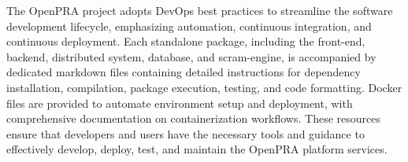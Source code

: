 The OpenPRA project adopts DevOps best practices to streamline the software development lifecycle, emphasizing automation, continuous integration, and continuous deployment. Each standalone package, including the front-end, backend, distributed system, database, and scram-engine, is accompanied by dedicated markdown files containing detailed instructions for dependency installation, compilation, package execution, testing, and code formatting. Docker files are provided to automate environment setup and deployment, with comprehensive documentation on containerization workflows. These resources ensure that developers and users have the necessary tools and guidance to effectively develop, deploy, test, and maintain the OpenPRA platform services.





